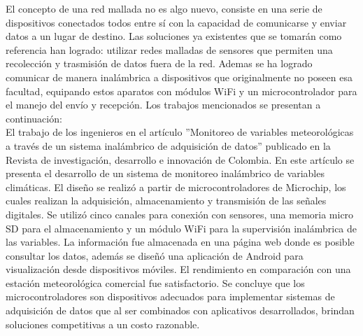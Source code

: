 \documentclass[12pt,letterpaper]{article}
\begin{document}
\vspace{1cm}


El concepto de una red mallada no es algo nuevo, consiste en una serie de dispositivos conectados todos entre sí con la capacidad de comunicarse y enviar datos a un lugar de destino. Las soluciones ya existentes que se tomarán como referencia han logrado: utilizar redes malladas de sensores que permiten una recolección y trasmisión de datos fuera de la red. Ademas se ha logrado comunicar de manera inalámbrica a dispositivos que originalmente no poseen esa facultad, equipando estos aparatos con módulos WiFi y un microcontrolador para el manejo del envío y recepción. Los trabajos mencionados se presentan a continuación:\\


El trabajo de los ingenieros \cite{RUIZ-AYALA2018} en el artículo ”Monitoreo de variables meteorológicas a través de un sistema inalámbrico de adquisición de datos” publicado en la Revista de investigación, desarrollo e innovación de Colombia. En este artículo se presenta el desarrollo de un sistema de monitoreo inalámbrico de variables climáticas. El diseño se realizó a partir de microcontroladores de Microchip, los cuales realizan la adquisición, almacenamiento y transmisión de las señales digitales. Se utilizó cinco canales para conexión con sensores, una memoria micro SD para el almacenamiento y un módulo WiFi para la supervisión inalámbrica de las variables. La información fue almacenada en una página web donde es posible consultar los datos, además se diseñó una aplicación de Android para visualización desde dispositivos móviles. El rendimiento en comparación con una estación meteorológica comercial fue satisfactorio. Se concluye que los microcontroladores son dispositivos adecuados para implementar sistemas de adquisición de datos que al ser combinados con aplicativos desarrollados, brindan soluciones competitivas a un costo razonable.\\
\end{document}
